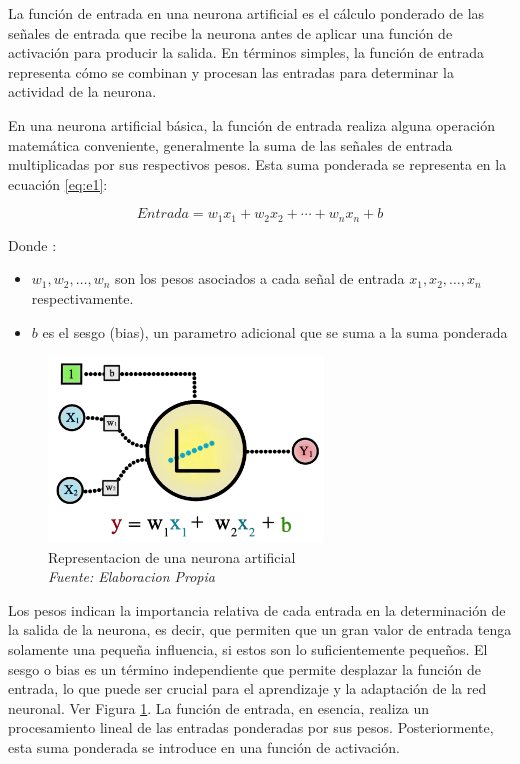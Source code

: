La función de entrada en una neurona artificial es el cálculo ponderado de las señales de entrada que recibe la neurona antes de aplicar una función de activación para producir la salida. En términos simples, la función de entrada representa cómo se combinan y procesan las entradas para determinar la actividad de la neurona.

En una neurona artificial básica, la función de entrada realiza alguna operación matemática conveniente, generalmente la suma de las señales de entrada multiplicadas por sus respectivos pesos. Esta suma ponderada se representa en la ecuación \ref{eq:e1}:

\begin{equation} \label{eq:e1} 
	Entrada = w_1x_1 + w_2x_2 + \cdots + w_nx_n + b 
\end{equation}

Donde : 
\begin{itemize}
\item $w_1, w_2, \ldots, w_n$ son los pesos asociados a cada señal de entrada $x_1, x_2, \ldots, x_n$ respectivamente.
\item $b$ es el sesgo (bias), un parametro adicional que se suma a la suma ponderada
\end{itemize}

\begin{figure}[h!]
	\includegraphics[width=0.65\textwidth]{capitulo2/figuras/an6.png}
	\caption{Representacion de una neurona artificial
		\\\textit{Fuente: Elaboracion Propia}}
	\label{fig:an6}
\end{figure}

Los pesos indican la importancia relativa de cada entrada en la determinación de la salida de la neurona, es decir, que permiten que un gran valor de entrada tenga solamente una pequeña influencia, si estos son lo suficientemente pequeños. El sesgo o bias es un término independiente que permite desplazar la función de entrada, lo que puede ser crucial para el aprendizaje y la adaptación de la red neuronal. Ver Figura \ref{fig:an6}. La función de entrada, en esencia, realiza un procesamiento lineal de las entradas ponderadas por sus pesos. Posteriormente, esta suma ponderada se introduce en una función de activación.

